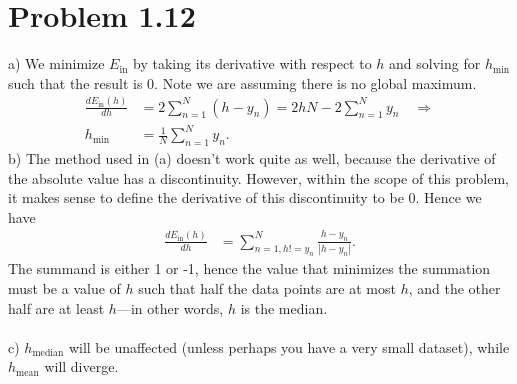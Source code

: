 \documentclass[11pt,letterpaper]{article}
\begin{document}
\section*{Problem 1.12}
a) We minimize $E_\textrm{in}$ by taking its derivative with respect to $h$ and solving for $h_\textrm{min}$ such that the result is 0.  Note we are assuming there is no global maximum.
\begin{align*}
    \frac{d E_\textrm{in}(h)}{dh} &= 2 \sum_{n = 1}^N (h - y_n)
     = 2 h N - 2 \sum_{n = 1}^N y_n \quad \Longrightarrow \\
     h_\textrm{min} &= \frac{1}{N} \sum_{n = 1}^N y_n.
\end{align*}
b) The method used in (a) doesn't work quite as well, because the derivative of the absolute value has a discontinuity.  However, within the scope of this problem, it makes sense to define the derivative of this discontinuity to be 0.  Hence we have
\begin{align*}
    \frac{d E_\textrm{in}(h)}{dh} &= \sum_{n = 1, h != y_n}^N \frac{h - y_n}{|h - y_n|}.
\end{align*}
The summand is either 1 or -1, hence the value that minimizes the summation must be a value of $h$ such that half the data points are at most $h$, and the other half are at least $h$---in other words, $h$ is the median.
\\\\
c) $h_\textrm{median}$ will be unaffected (unless perhaps you have a very small dataset), while $h_\textrm{mean}$ will diverge.
\end{document}
